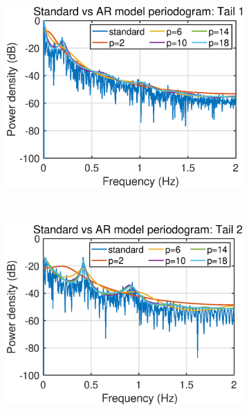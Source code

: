 \begin{figure}[t]
     \centering
     \begin{subfigure}[b]{0.4\textwidth}
         \centering
         \includegraphics[width=\textwidth]{fig/15/15c1.eps}
     \end{subfigure}
     ~
     \begin{subfigure}[b]{0.4\textwidth}
         \centering
         \includegraphics[width=\textwidth]{fig/15/15c2.eps}
     \end{subfigure}
     ~
     \begin{subfigure}[b]{0.4\textwidth}
         \centering

\end{subfigure}
\end{figure}
